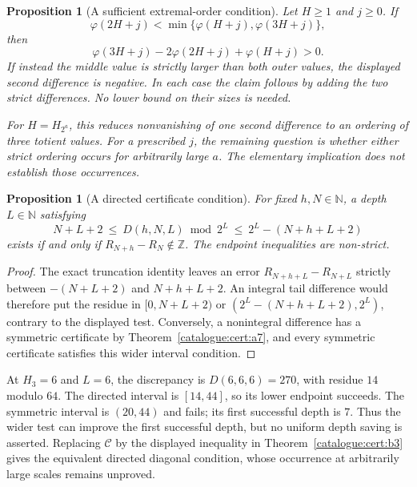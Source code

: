 \documentclass[11pt]{article}
\theoremstyle{plain}
\newtheorem{prop}[thm]{Proposition}
\theoremstyle{definition}
\theoremstyle{remark}
\newcommand{\N}{\mathbb{N}}
\begin{document}
\begin{prop}[A sufficient extremal-order condition]\label{prop:FR-01}
Let $H\ge1$ and $j\ge0$. If
\[
 \varphi(2H+j)<\min\{\varphi(H+j),\varphi(3H+j)\},
\]
then
\[
 \varphi(3H+j)-2\varphi(2H+j)+\varphi(H+j)>0.
\]
If instead the middle value is strictly larger than both outer values,
the displayed second difference is negative. In each case the claim
follows by adding the two strict differences. No lower bound on their
sizes is needed.

For $H=H_{2^a}$, this reduces nonvanishing of one second difference to an
ordering of three totient values. For a prescribed $j$, the remaining
question is whether either strict ordering occurs for arbitrarily large
$a$. The elementary implication does not establish those occurrences.
\end{prop}

\begin{prop}[A directed certificate condition]\label{prop:CP-06}
For fixed $h,N\in\N$, a depth $L\in\N$ satisfying
\[
 N+L+2\ \le\ D(h,N,L)\bmod2^L
 \ \le\ 2^L-(N+h+L+2)
\]
exists if and only if $R_{N+h}-R_N\notin\mathbb Z$.
The endpoint inequalities are non-strict.
\end{prop}

\begin{proof}
The exact truncation identity leaves an error $R_{N+h+L}-R_{N+L}$ strictly between
$-(N+L+2)$ and $N+h+L+2$. An integral tail difference would therefore
put the residue in $[0,N+L+2)$ or
$(2^L-(N+h+L+2),2^L)$, contrary to the displayed test.
Conversely, a nonintegral difference has a symmetric certificate by
Theorem~\ref{catalogue:cert:a7}, and every symmetric certificate
satisfies this wider interval condition.
\end{proof}

At $H_3=6$ and $L=6$, the discrepancy is $D(6,6,6)=270$,
with residue $14$ modulo $64$. The directed interval is $[14,44]$,
so its lower endpoint succeeds. The symmetric interval is $(20,44)$
and fails; its first successful depth is $7$. Thus the wider test
can improve the first successful depth, but no uniform depth saving
is asserted. Replacing $\mathcal C$ by the displayed inequality in
Theorem~\ref{catalogue:cert:b3} gives the equivalent directed diagonal
condition, whose occurrence at arbitrarily large scales remains unproved.
\end{document}
